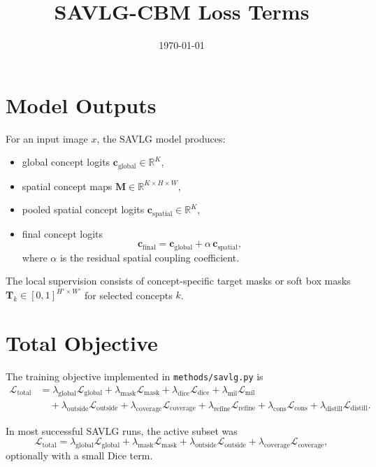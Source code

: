 \documentclass[11pt]{article}
\title{SAVLG-CBM Loss Terms}
\author{}
\date{\today}
\begin{document}
\maketitle

\section{Model Outputs}
For an input image $x$, the SAVLG model produces:
\begin{itemize}
    \item global concept logits $\bm{c}_{\mathrm{global}} \in \mathbb{R}^K$,
    \item spatial concept maps $\bm{M} \in \mathbb{R}^{K \times H \times W}$,
    \item pooled spatial concept logits $\bm{c}_{\mathrm{spatial}} \in \mathbb{R}^K$,
    \item final concept logits
    \[
        \bm{c}_{\mathrm{final}}
        =
        \bm{c}_{\mathrm{global}}
        +
        \alpha \, \bm{c}_{\mathrm{spatial}},
    \]
    where $\alpha$ is the residual spatial coupling coefficient.
\end{itemize}

The local supervision consists of concept-specific target masks or soft box masks
$\bm{T}_{k} \in [0,1]^{H' \times W'}$ for selected concepts $k$.

\section{Total Objective}
The training objective implemented in \texttt{methods/savlg.py} is
\begin{align}
\mathcal{L}_{\mathrm{total}}
&=
\lambda_{\mathrm{global}} \mathcal{L}_{\mathrm{global}}
+
\lambda_{\mathrm{mask}} \mathcal{L}_{\mathrm{mask}}
+
\lambda_{\mathrm{dice}} \mathcal{L}_{\mathrm{dice}}
+
\lambda_{\mathrm{mil}} \mathcal{L}_{\mathrm{mil}}
\nonumber\\
&\quad
+
\lambda_{\mathrm{outside}} \mathcal{L}_{\mathrm{outside}}
+
\lambda_{\mathrm{coverage}} \mathcal{L}_{\mathrm{coverage}}
+
\lambda_{\mathrm{refine}} \mathcal{L}_{\mathrm{refine}}
+
\lambda_{\mathrm{cons}} \mathcal{L}_{\mathrm{cons}}
+
\lambda_{\mathrm{distill}} \mathcal{L}_{\mathrm{distill}}.
\end{align}

In most successful SAVLG runs, the active subset was
\[
\mathcal{L}_{\mathrm{total}}
=
\lambda_{\mathrm{global}} \mathcal{L}_{\mathrm{global}}
+
\lambda_{\mathrm{mask}} \mathcal{L}_{\mathrm{mask}}
+
\lambda_{\mathrm{outside}} \mathcal{L}_{\mathrm{outside}}
+
\lambda_{\mathrm{coverage}} \mathcal{L}_{\mathrm{coverage}},
\]
optionally with a small Dice term.
\end{document}
